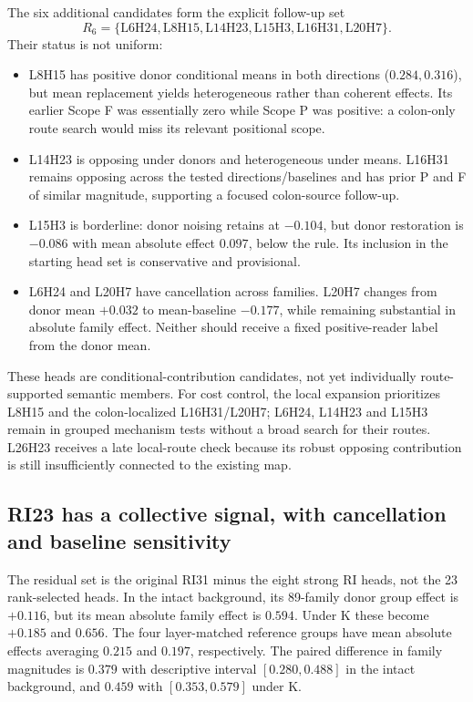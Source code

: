 The six additional candidates form the explicit follow-up set
\[
R_6=\{\mathrm{L6H24,L8H15,L14H23,L15H3,L16H31,L20H7}\}.
\]
Their status is not uniform:
\begin{itemize}
\item L8H15 has positive donor conditional means in both directions ($0.284,0.316$), but mean replacement yields heterogeneous rather than coherent effects. Its earlier Scope F was essentially zero while Scope P was positive: a colon-only route search would miss its relevant positional scope.
\item L14H23 is opposing under donors and heterogeneous under means. L16H31 remains opposing across the tested directions/baselines and has prior P and F of similar magnitude, supporting a focused colon-source follow-up.
\item L15H3 is borderline: donor noising retains at $-0.104$, but donor restoration is $-0.086$ with mean absolute effect $0.097$, below the rule. Its inclusion in the starting head set is conservative and provisional.
\item L6H24 and L20H7 have cancellation across families. L20H7 changes from donor mean $+0.032$ to mean-baseline $-0.177$, while remaining substantial in absolute family effect. Neither should receive a fixed positive-reader label from the donor mean.
\end{itemize}

These heads are conditional-contribution candidates, not yet individually route-supported semantic members. For cost control, the local expansion prioritizes L8H15 and the colon-localized L16H31/L20H7; L6H24, L14H23 and L15H3 remain in grouped mechanism tests without a broad search for their routes. L26H23 receives a late local-route check because its robust opposing contribution is still insufficiently connected to the existing map.

\subsection{RI23 has a collective signal, with cancellation and baseline sensitivity}
The residual set is the original RI31 minus the eight strong RI heads, not the 23 rank-selected heads. In the intact background, its 89-family donor group effect is $+0.116$, but its mean absolute family effect is $0.594$. Under K these become $+0.185$ and $0.656$. The four layer-matched reference groups have mean absolute effects averaging $0.215$ and $0.197$, respectively. The paired difference in family magnitudes is $0.379$ with descriptive interval $[0.280,0.488]$ in the intact background, and $0.459$ with $[0.353,0.579]$ under K.

